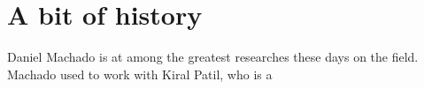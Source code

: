 \chapter{A bit of history}
\label{app:A}



Daniel Machado is at among the greatest researches these days on the field. 
Machado used to work with Kiral Patil, who is a 





